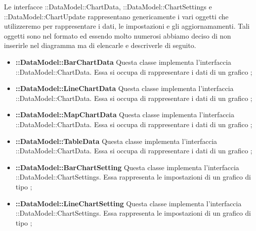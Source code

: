 	Le interfacce ::DataModel::ChartData, ::DataModel::ChartSettings e \linebreak {}::DataModel::ChartUpdate rappresentano genericamente i vari oggetti che utilizzeremo per rappresentare i dati, le impostazioni e gli aggiornamamenti. Tali oggetti sono nel formato  ed essendo molto numerosi abbiamo deciso di non inserirle nel diagramma ma di elencarle e descriverle di seguito.

	\begin{itemize}
		\item \textbf{::DataModel::BarChartData} Questa classe implementa l'interfaccia \linebreak {}::DataModel::ChartData. Essa si occupa di rappresentare i dati di un grafico ;

		\item \textbf{::DataModel::LineChartData} Questa classe implementa l'interfaccia \linebreak {}::DataModel::ChartData. Essa si occupa di rappresentare i dati di un grafico ;

		\item \textbf{::DataModel::MapChartData} Questa classe implementa l'interfaccia \linebreak {}::DataModel::ChartData. Essa si occupa di rappresentare i dati di un grafico ;

		\item \textbf{::DataModel::TableData} Questa classe implementa l'interfaccia \linebreak {}::DataModel::ChartData. Essa si occupa di rappresentare i dati di un grafico ;

		\item \textbf{::DataModel::BarChartSetting} Questa classe implementa l'interfaccia \linebreak {}::DataModel::ChartSettings. Essa rappresenta le impostazioni di un grafico di tipo ;

		\item \textbf{::DataModel::LineChartSetting} Questa classe implementa l'interfaccia \linebreak {}::DataModel::ChartSettings. Essa rappresenta le impostazioni di un grafico di tipo ;


\end{itemize}
